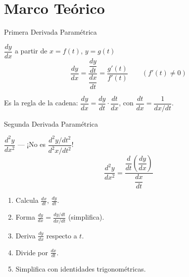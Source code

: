 \documentclass[aspectratio=169]{beamer}
\begin{document}
\begin{frame}[plain]
  \titlepage
\end{frame}

\section{Marco Teórico}

\begin{frame}{Primera Derivada Paramétrica}
  \begin{block}{$\dfrac{dy}{dx}$ a partir de $x = f(t)$, $y = g(t)$}
    \[
      \frac{dy}{dx} = \frac{\dfrac{dy}{dt}}{\dfrac{dx}{dt}} = \frac{g'(t)}{f'(t)} \qquad (f'(t) \neq 0)
    \]
  \end{block}
  \vspace{6pt}
  \begin{mwextra}[Intuición]
    Es la regla de la cadena: $\dfrac{dy}{dx} = \dfrac{dy}{dt}\cdot\dfrac{dt}{dx}$, con $\dfrac{dt}{dx} = \dfrac{1}{dx/dt}$.
  \end{mwextra}
\end{frame}

\begin{frame}{Segunda Derivada Paramétrica}
  \begin{block}{$\dfrac{d^2y}{dx^2}$ — ¡No es $\dfrac{d^2y/dt^2}{d^2x/dt^2}$!}
    \[
      \frac{d^2y}{dx^2} = \frac{\dfrac{d}{dt}\left(\dfrac{dy}{dx}\right)}{\dfrac{dx}{dt}}
    \]
  \end{block}
  \vspace{6pt}
  \begin{mwpasos}[Pasos]
    \begin{enumerate}
      \item Calcula $\frac{dx}{dt}$, $\frac{dy}{dt}$.
      \item Forma $\frac{dy}{dx} = \frac{dy/dt}{dx/dt}$ (simplifica).
      \item Deriva $\frac{dy}{dx}$ respecto a $t$.
      \item Divide por $\frac{dx}{dt}$.
      \item Simplifica con identidades trigonométricas.
    \end{enumerate}
  \end{mwpasos}
\end{frame}
\end{document}
